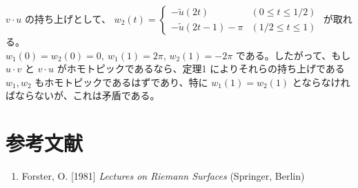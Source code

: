 \documentclass{jsarticle}
\theoremstyle{definition}
\begin{document}
    $v \cdot u$ の持ち上げとして、
    $w_2(t) = \left\{
    \begin{array}{ll}
    -\widetilde{u}(2t) & (0 \leq t \leq 1/2) \\
    -\widetilde{u}(2t-1) - \pi & (1/2 \leq t \leq 1)
    \end{array}
    \right.$ が取れる。\\
    $w_1(0) = w_2(0) = 0, \ w_1(1) = 2\pi, \, w_2(1) = -2\pi$ である。したがって、もし $u \cdot v$ と $v \cdot u$ がホモトピックであるなら、定理1 によりそれらの持ち上げである $w_1, w_2$ もホモトピックであるはずであり、特に $w_1(1) = w_2(1)$ とならなければならないが、これは矛盾である。
    
    \section*{参考文献}
    \begin{enumerate}[]
        \item Forster, O. [1981] {\it Lectures on Riemann Surfaces} (Springer, Berlin)
    \end{enumerate}
\end{document}
